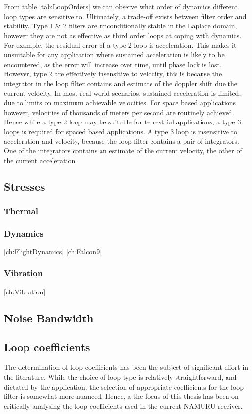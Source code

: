     From table \ref{tab:LoopOrders} we can observe what order of dynamics different loop types are sensitive to. Ultimately, a trade-off exists between filter order and stability. Type 1 \& 2 filters are unconditionally stable in the Laplace domain, however they are not as effective as third order loops at coping with dynamics. For example, the residual error of a type 2 loop is acceleration. This makes it unsuitable for any application where sustained acceleration is likely to be encountered, as the error will increase over time, until phase lock is lost. However, type 2 are effectively insensitive to velocity, this is because the integrator in the loop filter contains and estimate of the doppler shift due the current velocity. In most real world scenarios, sustained acceleration is limited, due to limits on maximum achievable velocities. For space based applications however, velocities of thousands of meters per second are routinely achieved. Hence while a type 2 loop may be suitable for terrestrial applications, a type 3 loops is required for spaced based applications. A type 3 loop is insensitive to acceleration and velocity, because the loop filter contains a pair of integrators. One of the integrators contains an estimate of the current velocity, the other of the current acceleration\cite{Kaplan}. 
    
    
    
	\subsection{Stresses}
		\subsubsection{Thermal}
		\subsubsection{Dynamics}
		\ref{ch:FlightDynamics}
		\ref{ch:Falcon9}
		\subsubsection{Vibration}
		\ref{ch:Vibration}

    \subsection{Noise Bandwidth}
    
    
	\subsection{Loop coefficients}
	The determination of loop coefficients has been the subject of significant effort in the literature.  While the choice of loop type is relatively straightforward, and dictated by the application, the selection of appropriate coefficients for the loop filter is somewhat more nuanced. Hence, a the focus of this thesis has been on critically analysing the loop coefficients used in the current \ac{NAMURU} receiver. 
	
